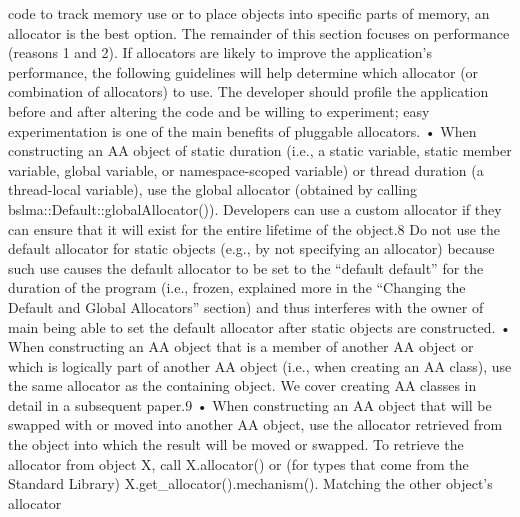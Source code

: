 code to track memory use or to place objects into specific parts of
memory, an allocator is the best option.
The remainder of this section focuses on performance (reasons 1 and 2). If
allocators are likely to improve the application’s performance, the following
guidelines will help determine which allocator (or combination of allocators) to
use. The developer should profile the application before and after altering the
code and be willing to experiment; easy experimentation is one of the main
benefits of pluggable allocators.
• When constructing an AA object of static duration (i.e., a static variable,
static member variable, global variable, or namespace-scoped variable) or
thread duration (a thread-local variable), use the global allocator
(obtained by calling bslma::Default::globalAllocator()). Developers
can use a custom allocator if they can ensure that it will exist for the
entire lifetime of the object.8 Do not use the default allocator for static
objects (e.g., by not specifying an allocator) because such use causes the
default allocator to be set to the “default default” for the duration of the
program (i.e., frozen, explained more in the “Changing the Default and
Global Allocators” section) and thus interferes with the owner of main
being able to set the default allocator after static objects are constructed.
• When constructing an AA object that is a member of another AA object or
which is logically part of another AA object (i.e., when creating an AA
class), use the same allocator as the containing object. We cover creating
AA classes in detail in a subsequent paper.9
• When constructing an AA object that will be swapped with or moved into
another AA object, use the allocator retrieved from the object into which
the result will be moved or swapped. To retrieve the allocator from object
X, call X.allocator() or (for types that come from the Standard Library)
X.get_allocator().mechanism(). Matching the other object’s allocator

